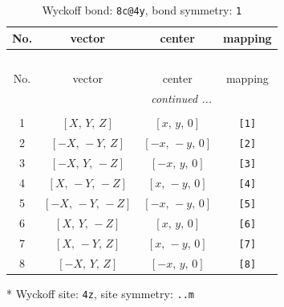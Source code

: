 \documentclass[fleqn,8pt]{jsarticle}
\begin{document}
\renewcommand{\arraystretch}{1.2}
\begin{longtable}{cccc}
\caption{Wyckoff bond: {\tt 8c@4y}, bond symmetry: {\tt 1}}
 \\
 \hline \hline
No. & vector & center & mapping \\ \hline \endfirsthead

\multicolumn{3}{l}{\tablename\ \thetable{}} \\
 \hline \hline
No. & vector & center & mapping \\ \hline \endhead

 \hline \hline
\multicolumn{3}{r}{\footnotesize\it continued ...} \\ \endfoot

 \hline \hline
\multicolumn{3}{r}{} \\ \endlastfoot

1 & $\left[ X,\, Y,\, Z \right]$ & $\left[ x,\, y,\, 0 \right]$ & {\tt [1]} \\ \hline
2 & $\left[ - X,\, - Y,\, Z \right]$ & $\left[ - x,\, - y,\, 0 \right]$ & {\tt [2]} \\ \hline
3 & $\left[ - X,\, Y,\, - Z \right]$ & $\left[ - x,\, y,\, 0 \right]$ & {\tt [3]} \\ \hline
4 & $\left[ X,\, - Y,\, - Z \right]$ & $\left[ x,\, - y,\, 0 \right]$ & {\tt [4]} \\ \hline
5 & $\left[ - X,\, - Y,\, - Z \right]$ & $\left[ - x,\, - y,\, 0 \right]$ & {\tt [5]} \\ \hline
6 & $\left[ X,\, Y,\, - Z \right]$ & $\left[ x,\, y,\, 0 \right]$ & {\tt [6]} \\ \hline
7 & $\left[ X,\, - Y,\, Z \right]$ & $\left[ x,\, - y,\, 0 \right]$ & {\tt [7]} \\ \hline
8 & $\left[ - X,\, Y,\, Z \right]$ & $\left[ - x,\, y,\, 0 \right]$ & {\tt [8]} \\
\end{longtable}
* Wyckoff site: {\tt 4z}, site symmetry: {\tt ..m}
\renewcommand{\arraystretch}{1.2}
\end{document}
